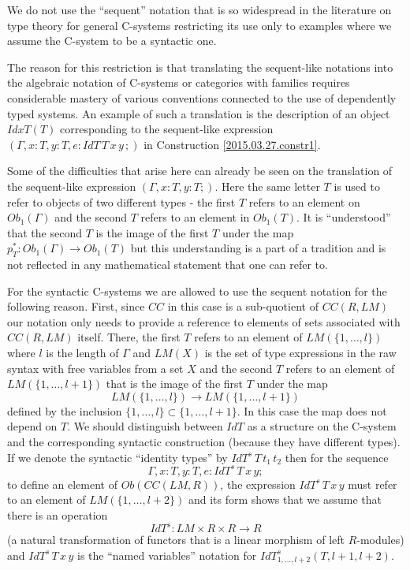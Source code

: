 \documentclass[12pt]{article}
\newcommand{\sr}{\rightarrow}
\begin{document}
We do not use the ``sequent'' notation that is so widespread in the literature on type theory for general C-systems restricting its use only to examples where we assume the C-system to be a syntactic one.

The reason for this restriction is that translating the sequent-like notations into the algebraic notation of C-systems or categories with families requires considerable mastery of various conventions connected to the use of dependently typed systems. An example of such a translation is the description of an object $IdxT(T)$ corresponding to the sequent-like expression $(\Gamma, x:T, y:T, e:IdT\, T\, x\, y\,;)$ in Construction \ref{2015.03.27.constr1}. 

Some of the difficulties that arise here can already be seen on the translation of the sequent-like expression $(\Gamma, x:T, y:T;)$. Here the same letter $T$ is used to refer to objects of two different types - the first $T$ refers to an element on $Ob_1(\Gamma)$ and the second $T$ refers to an element in $Ob_1(T)$. It is ``understood'' that the second $T$ is the image of the first $T$ under the map $p_T^*:Ob_1(\Gamma)\sr Ob_1(T)$ but this understanding is a part of a tradition and  is not reflected in any mathematical statement that one can refer to. 

For the syntactic C-systems we are allowed to use the sequent notation for the following reason. First, since $CC$ in this case is a sub-quotient of $CC(R,LM)$ our notation only needs to provide a reference to elements of sets associated with $CC(R,LM)$ itself.  There, the first $T$ refers to an element of $LM(\{1,\dots,l\})$ where $l$ is the length of $\Gamma$ and $LM(X)$ is the set of type expressions in the raw syntax with free variables from a set $X$ and the second $T$ refers to an element of $LM(\{1,\dots,l+1\})$ that is the image of the first $T$ under the map
%
$$LM(\{1,\dots,l\})\sr LM(\{1,\dots,l+1\})$$
%
defined by the inclusion $\{1,\dots,l\}\subset \{1,\dots,l+1\}$. In this case the map does not depend on $T$. We should distinguish between $IdT$ as a structure on the C-system and the corresponding syntactic construction (because they have different types). If we denote the syntactic ``identity types'' by $IdT^s\, T\, t_1\, t_2$ then for the sequence 
%
$$\Gamma, x:T, y:T, e:IdT^s\,T\,x\,y;$$
%
to define an element of $Ob(CC(LM,R))$, the expression $IdT^s\,T\,x\,y$ must refer to an element of $LM(\{1,\dots,l+2\})$ and its form shows that we assume that there is an operation
%
$$IdT^s:LM\times R\times R\sr R$$
%
(a natural transformation of functors that is a linear morphism of left $R$-modules) and $IdT^s\,T\,x\,y$ is the ``named variables'' notation for $IdT^s_{{1,\dots,l+2}}(T,l+1,l+2)$. 
\end{document}
